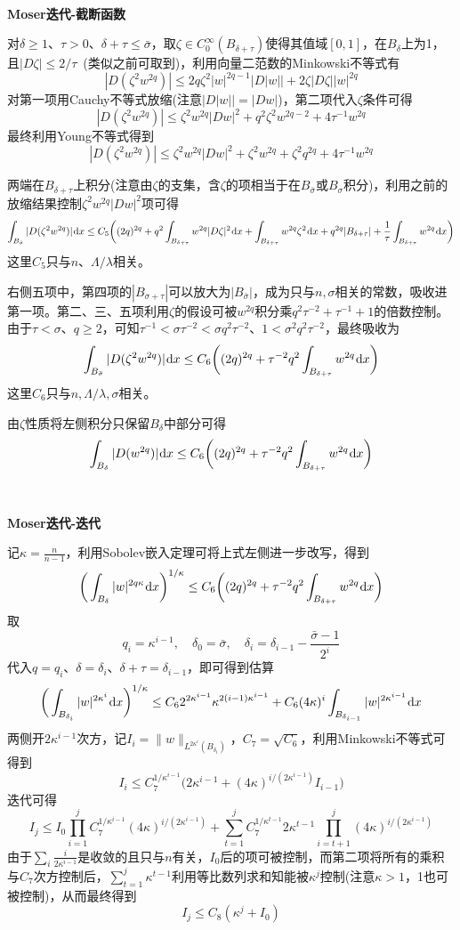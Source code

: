 \documentclass[a4paper,UTF8,fontset=windows,AutoFakeBold]{ctexart}
\newcommand*{\dr}{\hspace{0.07em}\mathrm{d}}
\begin{document}
{    \

    \textbf{Moser迭代-截断函数}

    对$\delta\ge1$、$\tau>0$、$\delta+\tau\le\bar\sigma$，取$\zeta\in C_0^{\infty}(B_{\delta+\tau})$使得其值域$[0,1]$，在$B_\delta$上为1，且$|D\zeta|\le2/\tau$\ (类似之前可取到)，利用向量二范数的Minkowski不等式有
    $$|D(\zeta^2w^{2q})|\le 2q\zeta^2|w|^{2q-1}|D|w||+2\zeta|D\zeta||w|^{2q}$$
    对第一项用Cauchy不等式放缩(注意$|D|w||=|Dw|$)，第二项代入$\zeta$条件可得
    $$|D(\zeta^2w^{2q})|\le\zeta^2w^{2q}|Dw|^2+q^2\zeta^2w^{2q-2}+4\tau^{-1}w^{2q}$$
    最终利用Young不等式得到
    $$|D(\zeta^2w^{2q})|\le\zeta^2w^{2q}|Dw|^2+\zeta^2w^{2q}+\zeta^2q^{2q}+4\tau^{-1}w^{2q}$$

    两端在$B_{\delta+\tau}$上积分(注意由$\zeta$的支集，含$\zeta$的项相当于在$B_{\bar\sigma}$或$B_\sigma$积分)，利用之前的放缩结果控制$\zeta^2w^{2q}|Dw|^2$项可得
    $$\int_{B_{\bar\sigma}}|D(\zeta^2w^{2q})|\dr x\le C_5\bigg((2q)^{2q}+q^2\int_{B_{\delta+\tau}}w^{2q}|D\zeta|^2\dr x+\int_{B_{\delta+\tau}}w^{2q}\zeta^2\dr x+q^{2q}|B_{\delta+\tau}|+\frac{1}{\tau}\int_{B_{\delta+\tau}}w^{2q}\dr x\bigg)$$
    这里$C_5$只与$n$、$\Lambda/\lambda$相关。

    右侧五项中，第四项的$|B_{\sigma+\tau}|$可以放大为$|B_{\bar\sigma}|$，成为只与$n,\sigma$相关的常数，吸收进第一项。第二、三、五项利用$\zeta$的假设可被$w^{2q}$积分乘$q^2\tau^{-2}+\tau^{-1}+1$的倍数控制。由于$\tau<\sigma$、$q\ge2$，可知$\tau^{-1}<\sigma\tau^{-2}<\sigma q^2\tau^{-2}$、$1<\sigma^2q^2\tau^{-2}$，最终吸收为
    $$\int_{B_{\bar\sigma}}|D(\zeta^2w^{2q})|\dr x\le C_6\bigg((2q)^{2q}+\tau^{-2}q^2\int_{B_{\delta+\tau}}w^{2q}\dr x\bigg)$$
    这里$C_6$只与$n,\Lambda/\lambda,\sigma$相关。

    由$\zeta$性质将左侧积分只保留$B_\delta$中部分可得
    $$\int_{B_\delta}|D(w^{2q})|\dr x\le C_6\bigg((2q)^{2q}+\tau^{-2}q^2\int_{B_{\delta+\tau}}w^{2q}\dr x\bigg)$$

    \

    \textbf{Moser迭代-迭代}

    记$\kappa=\frac{n}{n-1}$，利用Sobolev嵌入定理可将上式左侧进一步改写，得到
    $$\bigg(\int_{B_\delta}|w|^{2q\kappa}\dr x\bigg)^{1/\kappa}\le C_6\bigg((2q)^{2q}+\tau^{-2}q^2\int_{B_{\delta+\tau}}w^{2q}\dr x\bigg)$$
    取
    $$q_i=\kappa^{i-1},\quad\delta_0=\bar\sigma,\quad\delta_i=\delta_{i-1}-\frac{\bar\sigma-1}{2^i}$$
    代入$q=q_i$、$\delta=\delta_i$、$\delta+\tau=\delta_{i-1}$，即可得到估算
    $$\bigg(\int_{B_{\delta_i}}|w|^{2\kappa^i}\dr x\bigg)^{1/\kappa}\le C_62^{2\kappa^{i-1}}\kappa^{2(i-1)\kappa^{i-1}}+C_6(4\kappa)^i\int_{B_{\delta_{i-1}}}|w|^{2\kappa^{i-1}}\dr x$$
    两侧开$2\kappa^{i-1}$次方，记$I_i=\|w\|_{L^{2\kappa^i}(B_{\delta_i})}$，$C_7=\sqrt{C_6}$，利用Minkowski不等式可得到
    $$I_i\le C_7^{1/\kappa^{i-1}}\big(2\kappa^{i-1}+(4\kappa)^{i/(2\kappa^{i-1})}I_{i-1}\big)$$
    迭代可得
    $$I_j\le I_0\prod_{i=1}^jC_7^{1/\kappa^{i-1}}(4\kappa)^{i/(2\kappa^{i-1})}+\sum_{t=1}^j C_7^{1/\kappa^{t-1}}2\kappa^{t-1}\prod_{i=t+1}^j(4\kappa)^{i/(2\kappa^{i-1})}$$
    由于$\sum_i\frac{i}{2\kappa^{i-1}}$是收敛的且只与$n$有关，$I_0$后的项可被控制，而第二项将所有的乘积与$C_7$次方控制后，$\sum_{t=1}^j\kappa^{t-1}$利用等比数列求和知能被$\kappa^j$控制(注意$\kappa>1$，1也可被控制)，从而最终得到
    $$I_j\le C_8(\kappa^j+I_0)$$

}
\end{document}
